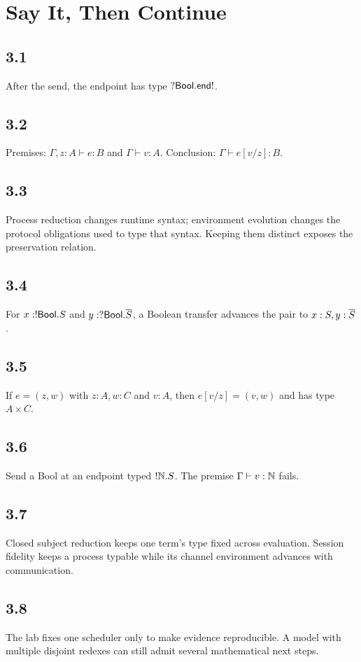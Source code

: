 \chapter{Say It, Then Continue}

\section*{3.1}
After the send, the endpoint has type $?\mathsf{Bool}.\mathsf{end!}$.

\section*{3.2}
Premises: $\Gamma,z:A\vdash e:B$ and $\Gamma\vdash v:A$. Conclusion: $\Gamma\vdash e[v/z]:B$.

\section*{3.3}
Process reduction changes runtime syntax; environment evolution changes the protocol obligations used to type that syntax. Keeping them distinct exposes the preservation relation.

\section*{3.4}
For $x:!\mathsf{Bool}.S$ and $y:?\mathsf{Bool}.\overline{S}$, a Boolean transfer advances the pair to $x:S,y:\overline{S}$.

\section*{3.5}
If $e=(z,w)$ with $z:A,w:C$ and $v:A$, then $e[v/z]=(v,w)$ and has type $A\times C$.

\section*{3.6}
Send a Bool at an endpoint typed $!\mathbb{N}.S$. The premise $\Gamma\vdash v:\mathbb{N}$ fails.

\section*{3.7}
Closed subject reduction keeps one term's type fixed across evaluation. Session fidelity keeps a process typable while its channel environment advances with communication.

\section*{3.8}
The lab fixes one scheduler only to make evidence reproducible. A model with multiple disjoint redexes can still admit several mathematical next steps.


